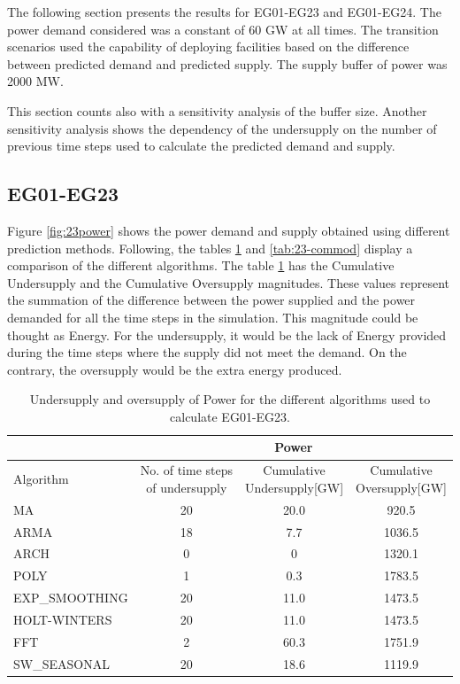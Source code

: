 \documentclass[11pt,letterpaper]{article}
\begin{document}

The following section presents the results for EG01-EG23 and EG01-EG24. The power demand considered was a constant of 60 GW at all times. The transition scenarios used the capability of deploying facilities based on the difference between predicted demand and predicted supply. The supply buffer of power was 2000 MW. 

This section counts also with a sensitivity analysis of the buffer size. Another sensitivity analysis shows the dependency of the undersupply on the number of previous time steps used to calculate the predicted demand and supply.

\subsection{EG01-EG23}

Figure \ref{fig:23power} shows the power demand and supply obtained using different prediction methods. Following, the tables \ref{tab:23-power} and \ref{tab:23-commod} display a comparison of the different algorithms. The table \ref{tab:23-power} has the Cumulative Undersupply and the Cumulative Oversupply magnitudes. These values represent the summation of the difference between the power supplied and the power demanded for all the time steps in the simulation. This magnitude could be thought as Energy. For the undersupply, it would be the lack of Energy provided during the time steps where the supply did not meet the demand. On the contrary, the oversupply would be the extra energy produced.

\begin{table}[]
	\centering
	\caption {Undersupply and oversupply of Power for the different algorithms used to calculate EG01-EG23.}
	\label{tab:23-power}
	\begin{tabular}{|l|c|c|c|}
		\hline
		& \multicolumn{3}{c|}{Power} \\ \hline
		Algorithm & \shortstack{No. of time steps\\of undersupply}  & 
		\shortstack{Cumulative\\Undersupply[GW]}  & \shortstack{Cumulative\\Oversupply[GW]} \\ \hline
		MA        & 20 	& 20.0  &  920.5   \\ \hline
		ARMA      & 18 	&  7.7  &  1036.5  \\ \hline
		ARCH      &  0 	&   0  	&  1320.1  \\ \hline
		POLY      &  1 	&  0.3 	&  1783.5  \\ \hline
		EXP\_SMOOTHING 	& 20 	& 11.0 & 1473.5 \\ \hline
		HOLT-WINTERS  	& 20 	& 11.0 & 1473.5 \\ \hline
		FFT       & 2 	& 60.3 	& 1751.9 	\\ \hline
		SW\_SEASONAL    & 20 	& 18.6 	& 1119.9 	\\ \hline
	\end{tabular}
\end{table}
\end{document}
